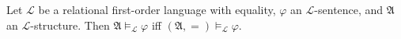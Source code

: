 Let $\mathcal{L}$ be a relational first-order language with equality, $\varphi$ an $\mathcal{L}$-sentence, and $\mathfrak{A}$ an $\mathcal{L}$-structure. Then $\mathfrak{A} \models_{\mathcal{L}} \varphi$ iff $(\mathfrak{A}, =) \models_{\mathcal{L}} \varphi$.
